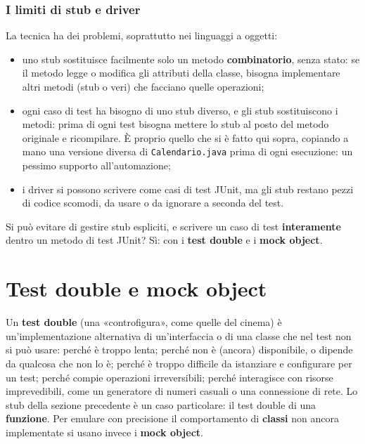 \subsubsection*{I limiti di stub e driver}

La tecnica ha dei problemi, soprattutto nei linguaggi a oggetti:

\begin{itemize}
  \item uno stub sostituisce facilmente solo un metodo \textbf{combinatorio}, senza stato: se il metodo legge o modifica
        gli attributi della classe, bisogna implementare altri metodi (stub o veri) che facciano quelle operazioni;
  \item ogni caso di test ha bisogno di uno stub diverso, e gli stub sostituiscono i metodi: prima di ogni test bisogna
        mettere lo stub al posto del metodo originale e ricompilare. È proprio quello che si è fatto qui sopra, copiando
        a mano una versione diversa di \texttt{Calendario.java} prima di ogni esecuzione: un pessimo supporto
        all'automazione;
  \item i driver si possono scrivere come casi di test JUnit, ma gli stub restano pezzi di codice scomodi, da usare o
        da ignorare a seconda del test.
\end{itemize}

Si può evitare di gestire stub espliciti, e scrivere un caso di test \textbf{interamente} dentro un metodo di test
JUnit? Sì: con i \textbf{test double} e i \textbf{mock object}.

\section{Test double e mock object}

Un \textbf{test double} (una «controfigura», come quelle del cinema) è un'implementazione alternativa di un'interfaccia
o di una classe che nel test non si può usare: perché è troppo lenta; perché non è (ancora) disponibile, o dipende da
qualcosa che non lo è; perché è troppo difficile da istanziare e configurare per un test; perché compie operazioni
irreversibili; perché interagisce con risorse imprevedibili, come un generatore di numeri casuali o una connessione di
rete. Lo stub della sezione precedente è un caso particolare: il test double di una \textbf{funzione}. Per emulare con
precisione il comportamento di \textbf{classi} non ancora implementate si usano invece i \textbf{mock object}.

